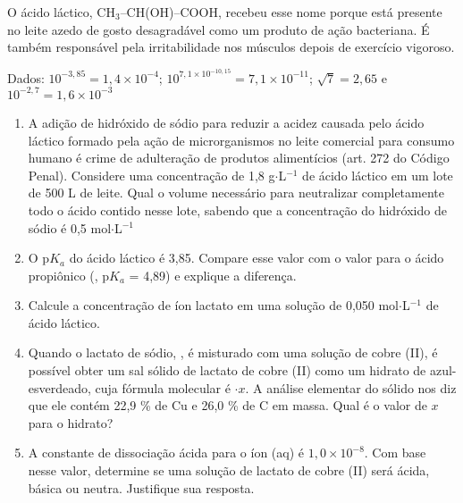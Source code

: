 O ácido láctico, CH$_3$–CH(OH)–COOH, recebeu esse nome porque está presente no leite azedo de gosto desagradável como um produto de ação bacteriana. É também responsável pela irritabilidade nos músculos depois de exercício vigoroso. 

Dados: $10^{-3,85} = 1,4 \times 10^{-4}$; $10^{7,1 \times 10^{-10,15}} = 7,1 \times 10^{-11}$; $\sqrt{7} = 2,65$ e $10^{-2,7} = 1,6 \times 10^{-3}$

\begin{enumerate}[label = (\alph*)]
	\item A adição de hidróxido de sódio para reduzir a acidez causada pelo ácido láctico formado pela ação de microrganismos no leite comercial para consumo humano é crime de adulteração de produtos alimentícios (art. 272 do Código Penal). Considere uma concentração de 1,8 g$\cdot$L$^{-1}$ de ácido láctico em um lote de 500 L de leite. Qual o volume necessário para neutralizar completamente todo o ácido contido nesse lote, sabendo que a concentração do hidróxido de sódio é 0,5 mol$\cdot$L$^{-1}$
	\item O p$K_a$ do ácido láctico é 3,85. Compare esse valor com o valor para o ácido propiônico (, p$K_a$ = 4,89) e explique a diferença.
	\item Calcule a concentração de íon lactato em uma solução de 0,050 mol$\cdot$L$^{-1}$ de ácido láctico.
	\item Quando o lactato de sódio, , é misturado com uma solução de cobre (II), é possível obter um sal sólido de lactato de cobre (II)
	como um hidrato de azul-esverdeado, cuja fórmula molecular é  $\cdot x$.
		A análise elementar do sólido nos diz que ele contém 22,9 \% de Cu e 26,0 \% de C em massa.
		Qual é o valor de $x$ para o hidrato?
	\item A constante de dissociação ácida para o íon (aq) é $1,0 \times 10^{-8}$.
		Com base nesse valor, determine se uma solução de lactato de cobre (II) será ácida, básica ou neutra.
		Justifique sua resposta.
\end{enumerate}
